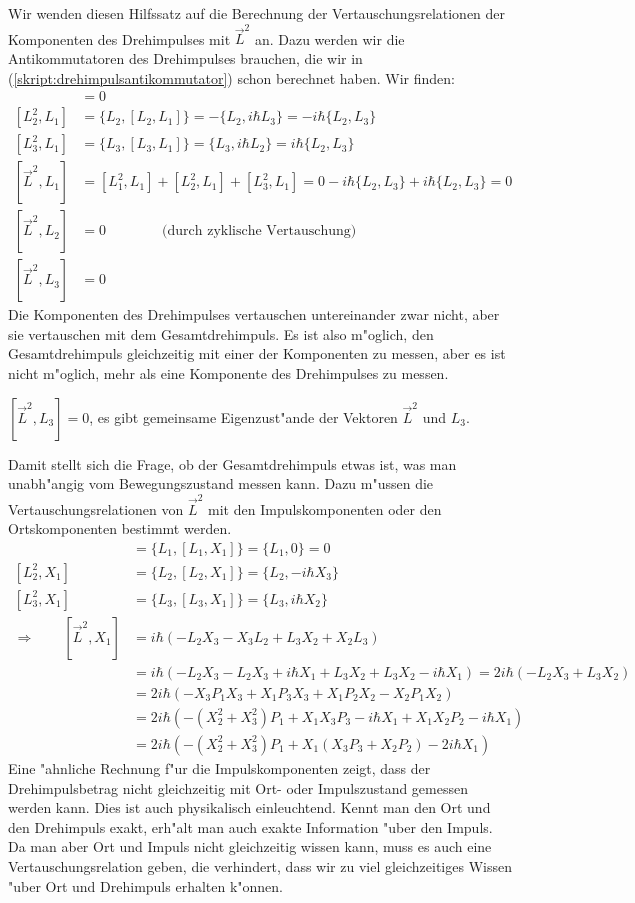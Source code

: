Wir wenden diesen Hilfssatz auf die Berechnung der Vertauschungsrelationen
der Komponenten des Drehimpulses mit $\vec L^2$ an.
Dazu werden wir die Antikommutatoren des Drehimpulses brauchen, die
wir in (\ref{skript:drehimpulsantikommutator}) schon berechnet haben.
Wir finden:
\begin{align*}
[L_1^2,L_1]&=0
\\
[L_2^2,L_1]
&=
\{L_2,[L_2,L_1]\}
=
-\{L_2,i\hbar L_3\}
=-i\hbar\{L_2,L_3\}
\\
[L_3^2,L_1]
&=
\{L_3,[L_3,L_1]\}
=
\{L_3,i\hbar L_2\}
=
i\hbar\{L_2,L_3\}
\\
[\vec L^2, L_1]
&=
[L_1^2,L_1]
+
[L_2^2,L_1]
+
[L_3^2,L_1]
=
0
-i\hbar\{L_2,L_3\}
+
i\hbar\{L_2,L_3\}
=
0
\\
[\vec L^2,L_2]&=0
\qquad
\qquad
\text{(durch zyklische Vertauschung)}
\\
[\vec L^2,L_3]&=0
\end{align*}
Die Komponenten des Drehimpulses vertauschen untereinander zwar nicht,
aber sie vertauschen mit dem Gesamtdrehimpuls. Es ist also m"oglich,
den Gesamtdrehimpuls gleichzeitig mit einer der Komponenten zu messen,
aber es ist nicht m"oglich, mehr als eine Komponente des Drehimpulses
zu messen.

\begin{hilfssatz}
$[\vec L^2, L_3]=0$, es gibt gemeinsame Eigenzust"ande
der Vektoren $\vec L^2$ und $L_3$.
\end{hilfssatz}

Damit stellt sich die Frage, ob der Gesamtdrehimpuls etwas ist,
was man unabh"angig vom Bewegungszustand messen kann.
Dazu m"ussen die Vertauschungsrelationen von $\vec L^2$ mit den
Impulskomponenten oder den Ortskomponenten bestimmt werden.
\begin{align*}
[L_1^2,X_1]
&=
\{L_1,[L_1,X_1]\}
=\{L_1,0\}=0
\\
[L_2^2,X_1]
&=
\{L_2,[L_2,X_1]\}
=
\{L_2,-i\hbar X_3\}
\\
[L_3^2,X_1]
&=
\{L_3,[L_3,X_1]\}
=
\{L_3, i\hbar X_2\}
\\
\Rightarrow\qquad
[\vec L^2,X_1]
&=
i\hbar(-L_2X_3-X_3L_2+L_3X_2+X_2L_3)
\\
&=
i\hbar(-L_2X_3-L_2X_3+i\hbar X_1 +L_3X_2+L_3X_2-i\hbar X_1)
=
2i\hbar(-L_2X_3 +L_3X_2)
\\
&=
2i\hbar(
-X_3P_1X_3+X_1P_3X_3+X_1P_2X_2-X_2P_1X_2
)
\\
&=
2i\hbar(
-(X_2^2+X_3^2)P_1+X_1X_3P_3-i\hbar X_1+ X_1X_2P_2-i\hbar X_1
)
\\
&=
2i\hbar(
-(X_2^2+X_3^2)P_1
+X_1(X_3P_3 + X_2P_2)
-2i\hbar X_1
)
\end{align*}
Eine "ahnliche Rechnung f"ur die Impulskomponenten zeigt, dass der
Drehimpulsbetrag nicht gleichzeitig mit Ort- oder Impulszustand
gemessen werden kann.
Dies ist auch physikalisch einleuchtend.
Kennt man den Ort und den Drehimpuls exakt, erh"alt man auch exakte
Information "uber den Impuls.
Da man aber Ort und Impuls nicht gleichzeitig wissen kann, muss es auch
eine Vertauschungsrelation geben, die verhindert, dass wir zu viel
gleichzeitiges Wissen "uber Ort und Drehimpuls erhalten k"onnen.

